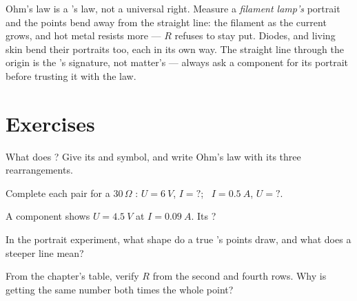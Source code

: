 \begin{remark}\label{rem:g8:ohms-law:limits}
Ohm's law is a 's law, not a universal right. Measure
a \emph{filament lamp's} portrait and the points bend away
from the straight line: the filament  as the current
grows, and hot metal resists more --- $R$ refuses to stay
put. Diodes,  and living skin bend their portraits too,
each in its own way. The straight line through the origin is
the 's signature, not matter's --- always ask a
component for its portrait before trusting it with the law.
\end{remark}

\section{Exercises}

\begin{exercise}[$\star$]\label{exo:g8:ohms-law:1}
What does  ? Give its  and symbol, and
write Ohm's law with its three rearrangements.
\end{exercise}

\begin{exercise}[$\star$]\label{exo:g8:ohms-law:2}
Complete each pair for a $30\,\Omega$ : $U =
\qty{6}{V}$, $I = {?}$; \ $I = \qty{0.5}{A}$, $U = {?}$.
\end{exercise}

\begin{exercise}[$\star$]\label{exo:g8:ohms-law:3}
A component shows $U = \qty{4.5}{V}$ at $I = \qty{0.09}{A}$.
Its ?
\end{exercise}

\begin{exercise}[$\star$]\label{exo:g8:ohms-law:4}
In the portrait experiment, what shape do a true 's
points draw, and what does a steeper line mean?
\end{exercise}

\begin{exercise}[$\star$]\label{exo:g8:ohms-law:5}
From the chapter's table, verify $R$ from the second and
fourth rows. Why is getting the same number both times the
whole point?
\end{exercise}

